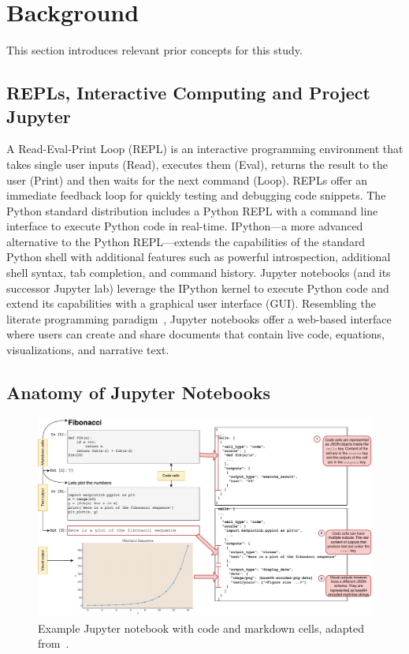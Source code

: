 \documentclass[smallextended]{svjour3}       %
\begin{document}
\section{Background}\label{sec:background}

This section introduces relevant prior concepts for this study.

\subsection{REPLs, Interactive Computing and Project Jupyter}

A Read-Eval-Print Loop (REPL) is an interactive programming environment that takes single user inputs (Read), executes them (Eval), returns the result to the user (Print) and then waits for the next command (Loop). REPLs offer an immediate feedback loop for quickly testing and debugging code snippets. The Python standard distribution includes a Python REPL with a command line interface to execute Python code in real-time. IPython---a more advanced alternative to the Python REPL---extends the capabilities of the standard Python shell with additional features such as powerful introspection, additional shell syntax, tab completion, and command history. Jupyter notebooks (and its successor Jupyter lab) leverage the IPython kernel to execute Python code and extend its capabilities with a graphical user interface (GUI). Resembling the literate programming paradigm~\citep{knuth1984literate}, Jupyter notebooks offer a web-based interface where users can create and share documents that contain live code, equations, visualizations, and narrative text.

\subsection{Anatomy of Jupyter Notebooks}

\begin{figure}
	\centering
	\includegraphics[width=\linewidth]{nb.pdf}
	\caption{Example Jupyter notebook with code and markdown cells, adapted from~\citep[Figure~1]{pimentel2019large-scale}.}
	\label{fig:nb}
\end{figure}
\end{document}
